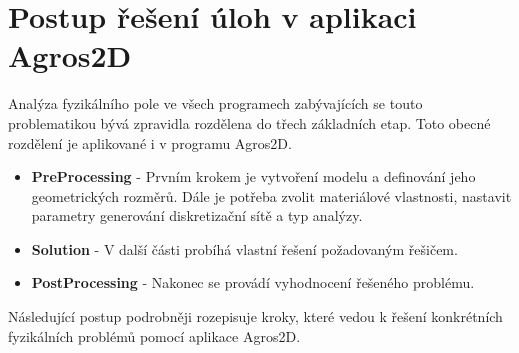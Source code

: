
\chapter{Postup řešení úloh v aplikaci Agros2D} 
Analýza fyzikálního pole ve všech programech zabývajících se touto problematikou bývá zpravidla rozdělena do třech základních etap. Toto obecné rozdělení je aplikované i v programu Agros2D.
\begin{itemize}
\item {\bf PreProcessing} - Prvním krokem je vytvoření modelu a definování jeho geometrických rozměrů. Dále je potřeba zvolit materiálové vlastnosti, nastavit parametry generování diskretizační sítě a typ analýzy.
\item {\bf Solution} - V další části probíhá vlastní řešení požadovaným řešičem.
\item {\bf PostProcessing} - Nakonec se provádí vyhodnocení řešeného problému.
\end{itemize}
Následující postup podrobněji rozepisuje kroky, které vedou k řešení konkrétních fyzikálních problémů pomocí aplikace Agros2D.
